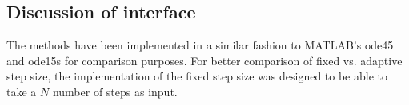 \subsection{Discussion of interface}
The methods have been implemented in a similar fashion to MATLAB's ode45 and ode15s for comparison purposes. For better comparison of fixed vs. adaptive step size, the implementation of the fixed step size was designed to be able to take a $N$ number of steps as input.